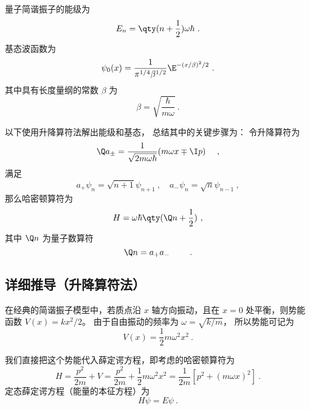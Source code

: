 
\begin{issues}
\issueAbstract
\end{issues}



量子简谐振子的能级为
\begin{equation}
E_n = \qty(n+\frac12)\omega \hbar~.
\end{equation}
基态波函数为
\begin{equation}
\psi_0 (x) = \frac{1}{\pi^{1/4} \beta^{1/2}} \E^{-(x/\beta)^2/2}~.
\end{equation}
其中具有长度量纲的常数 $\beta$ 为
\begin{equation}
\beta  = \sqrt{\frac{\hbar}{m\omega}}~.
\end{equation}

以下使用升降算符法解出能级和基态， 总结其中的关键步骤为： 令升降算符为
\begin{equation}
\Q a_\pm = \frac{1}{\sqrt{2m\omega\hbar}} (m\omega x \mp \I p) \quad~,
\end{equation}
满足
\begin{equation}
a_+ \psi_n = \sqrt{n + 1} \psi_{n+1}~,
\quad
a_- \psi_n = \sqrt n \psi_{n-1}~,
\end{equation}
那么哈密顿算符为
\begin{equation}
H = \omega\hbar \qty(\Q n + \frac12)~,
\end{equation}
其中 $\Q n$ 为量子数算符
\begin{equation}
\Q n = a_+ a_ - \qquad~.
\end{equation}

\subsection{详细推导（升降算符法）}

在经典的简谐振子模型中，若质点沿 $x$ 轴方向振动，且在 $x = 0$ 处平衡，则势能函数 $V(x) = k x^2/2$。 由于自由振动的频率为 $\omega = \sqrt{k/m}$， 所以势能可记为
\begin{equation}
V(x) = \frac12 m \omega^2 x^2~.
\end{equation}

我们直接把这个势能代入薛定谔方程，即考虑的哈密顿算符为
\begin{equation}
H = \frac{p^2}{2m} + V = \frac{p^2}{2m} + \frac12 m\omega^2 x^2 = \frac{1}{2m} [p^2 + (m\omega x)^2]~.
\end{equation}
定态薛定谔方程（能量的本征方程）为
\begin{equation}\label{eq_QSHOop_6}
H\psi  = E\psi~.
\end{equation}

